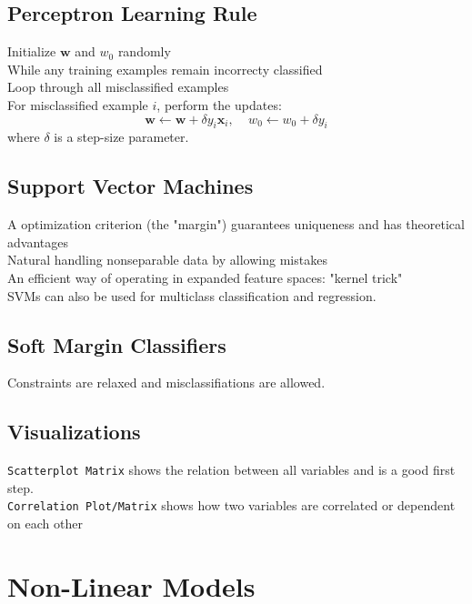\documentclass[10pt,landscape,a4paper]{cheatsheet}
\newcommand{\x}{\mathbf{x}}
\begin{document}
  \subsection{Perceptron Learning Rule}

    Initialize ${{\mathbf{w}}}$ and $w_0$ randomly\\
    While any training examples remain incorrecty classified\\
        Loop through all misclassified examples\\
        For misclassified example $i$, perform the updates:\\
        $${{\mathbf{w}}}\gets {{\mathbf{w}}}+ \delta y_i{{\x}}_i,~~~~~w_0\gets w_0 + \delta y_i$$
        where $\delta$ is a step-size parameter.

  \subsection{Support Vector Machines}

  A optimization criterion (the "margin") guarantees uniqueness and has theoretical advantages\\
  Natural handling nonseparable data by allowing mistakes\\
  An efficient way of operating in expanded  feature spaces: "kernel trick"\\
  SVMs can also be used for multiclass classification and regression.\\

  \subsection{Soft Margin Classifiers}
  
  Constraints are relaxed and misclassifiations are allowed.

  \subsection{Visualizations}
  
  \texttt{Scatterplot Matrix} shows the relation between all variables and is a good first step.\\
  \texttt{Correlation Plot/Matrix} shows how two variables are correlated or dependent on each other

  \section{Non-Linear Models}
\end{document}
